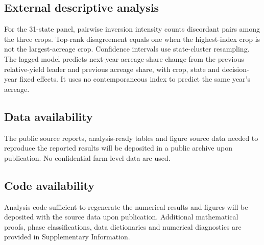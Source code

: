 \subsection{External descriptive analysis}

For the 31-state panel, pairwise inversion intensity counts discordant pairs
among the three crops. Top-rank disagreement equals one when the highest-index
crop is not the largest-acreage crop. Confidence intervals use state-cluster
resampling. The lagged model predicts next-year acreage-share change from the
previous relative-yield leader and previous acreage share, with crop, state
and decision-year fixed effects. It uses no contemporaneous index to predict
the same year's acreage.

\subsection{Data availability}

The public source reports, analysis-ready tables and figure source data needed
to reproduce the reported results will be deposited in a public
archive upon publication. No confidential farm-level data are used.

\subsection{Code availability}

Analysis code sufficient to regenerate the numerical results and figures will
be deposited with the source data upon publication. Additional mathematical
proofs, phase classifications, data dictionaries and numerical diagnostics
are provided in Supplementary Information.
